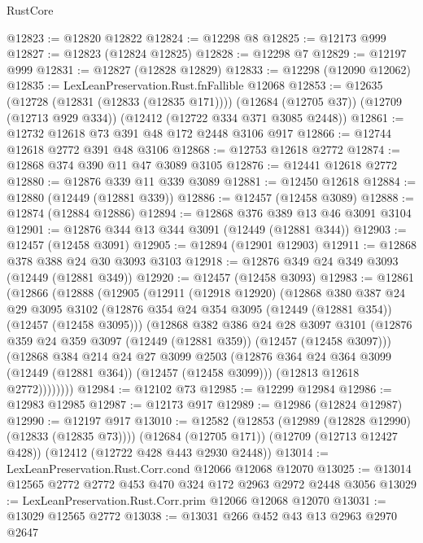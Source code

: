 \begin{lexlean}{RustCore}
\begin{coremodule}
@12823 := @12820 @12822
@12824 := @12298 @8
@12825 := @12173 @999
@12827 := @12823 (@12824 @12825)
@12828 := @12298 @7
@12829 := @12197 @999
@12831 := @12827 (@12828 @12829)
@12833 := @12298 (@12090 @12062)
@12835 := LexLeanPreservation.Rust.fnFallible @12068
@12853 := @12635
    (@12728 (@12831 (@12833 (@12835 @171))))
    (@12684 (@12705 @37))
    (@12709 (@12713 @929 @334))
    (@12412 (@12722 @334 @371 @3085 @2448))
@12861 := @12732 @12618 @73 @391 @48 @172 @2448 @3106 @917
@12866 := @12744 @12618 @2772 @391 @48 @3106
@12868 := @12753 @12618 @2772
@12874 := @12868 @374 @390 @11 @47 @3089 @3105
@12876 := @12441 @12618 @2772
@12880 := @12876 @339 @11 @339 @3089
@12881 := @12450 @12618
@12884 := @12880 (@12449 (@12881 @339))
@12886 := @12457 (@12458 @3089)
@12888 := @12874 (@12884 @12886)
@12894 := @12868 @376 @389 @13 @46 @3091 @3104
@12901 := @12876 @344 @13 @344 @3091 (@12449 (@12881 @344))
@12903 := @12457 (@12458 @3091)
@12905 := @12894 (@12901 @12903)
@12911 := @12868 @378 @388 @24 @30 @3093 @3103
@12918 := @12876 @349 @24 @349 @3093 (@12449 (@12881 @349))
@12920 := @12457 (@12458 @3093)
@12983 := @12861
    (@12866
      (@12888
        (@12905
          (@12911
            (@12918 @12920)
            (@12868
              @380
              @387
              @24
              @29
              @3095
              @3102
              (@12876 @354 @24 @354 @3095 (@12449 (@12881 @354)) (@12457 (@12458 @3095)))
              (@12868
                @382
                @386
                @24
                @28
                @3097
                @3101
                (@12876 @359 @24 @359 @3097 (@12449 (@12881 @359)) (@12457 (@12458 @3097)))
                (@12868
                  @384
                  @214
                  @24
                  @27
                  @3099
                  @2503
                  (@12876 @364 @24 @364 @3099 (@12449 (@12881 @364)) (@12457 (@12458 @3099)))
                  (@12813 @12618 @2772))))))))
@12984 := @12102 @73
@12985 := @12299 @12984
@12986 := @12983 @12985
@12987 := @12173 @917
@12989 := @12986 (@12824 @12987)
@12990 := @12197 @917
@13010 := @12582
    (@12853 (@12989 (@12828 @12990) (@12833 (@12835 @73))))
    (@12684 (@12705 @171))
    (@12709 (@12713 @12427 @428))
    (@12412 (@12722 @428 @443 @2930 @2448))
@13014 := LexLeanPreservation.Rust.Corr.cond @12066 @12068 @12070
@13025 := @13014 @12565 @2772 @2772 @453 @470 @324 @172 @2963 @2972 @2448 @3056
@13029 := LexLeanPreservation.Rust.Corr.prim @12066 @12068 @12070
@13031 := @13029 @12565 @2772
@13038 := @13031 @266 @452 @43 @13 @2963 @2970 @2647

\end{coremodule}
\end{lexlean}
